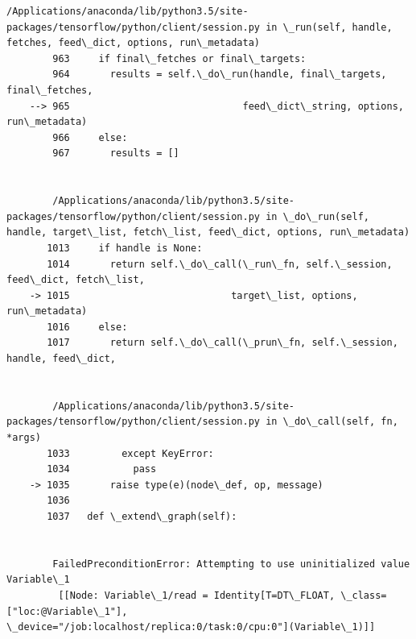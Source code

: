 \documentclass[11pt]{article}
\begin{document}
\begin{Verbatim}[commandchars=\\\{\}]
        /Applications/anaconda/lib/python3.5/site-packages/tensorflow/python/client/session.py in \_run(self, handle, fetches, feed\_dict, options, run\_metadata)
        963     if final\_fetches or final\_targets:
        964       results = self.\_do\_run(handle, final\_targets, final\_fetches,
    --> 965                              feed\_dict\_string, options, run\_metadata)
        966     else:
        967       results = []


        /Applications/anaconda/lib/python3.5/site-packages/tensorflow/python/client/session.py in \_do\_run(self, handle, target\_list, fetch\_list, feed\_dict, options, run\_metadata)
       1013     if handle is None:
       1014       return self.\_do\_call(\_run\_fn, self.\_session, feed\_dict, fetch\_list,
    -> 1015                            target\_list, options, run\_metadata)
       1016     else:
       1017       return self.\_do\_call(\_prun\_fn, self.\_session, handle, feed\_dict,


        /Applications/anaconda/lib/python3.5/site-packages/tensorflow/python/client/session.py in \_do\_call(self, fn, *args)
       1033         except KeyError:
       1034           pass
    -> 1035       raise type(e)(node\_def, op, message)
       1036 
       1037   def \_extend\_graph(self):


        FailedPreconditionError: Attempting to use uninitialized value Variable\_1
    	 [[Node: Variable\_1/read = Identity[T=DT\_FLOAT, \_class=["loc:@Variable\_1"], \_device="/job:localhost/replica:0/task:0/cpu:0"](Variable\_1)]]
    

\end{Verbatim}
\end{document}

